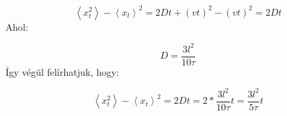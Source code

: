 \begin{equation} \label{eq:39}
    \left< x_{t}^{2} \right> - \left< x_{t} \right>^{2}
    =
    2Dt + \left( vt \right)^{2} - \left( vt \right)^{2}
    =
    \boxed{2Dt}
\end{equation}
Ahol:

\begin{equation*}
    D = \frac{3 l^{2}}{10 \tau}
\end{equation*}
Így végül felírhatjuk, hogy:

\begin{equation} \label{eq:40}
    \left< x_{t}^{2} \right> - \left< x_{t} \right>^{2}
    =
    2Dt
    =
    2 * \frac{3 l^{2}}{10 \tau} t
    =
    \boxed{\frac{3 l^{2}}{5 \tau} t}
\end{equation}
